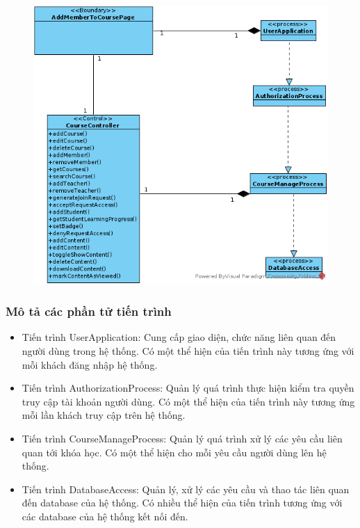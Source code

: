 \documentclass[./../main_file.tex]{subfiles}
\begin{document}
\begin{figure}[H]
	\centering
	\includegraphics[width=\linewidth]{./images/pv_add_course_member.png}
\end{figure}

\subsubsection{Mô tả các phần tử tiến trình}
\begin{itemize}
	\item Tiến trình UserApplication: Cung cấp giao diện, chức năng liên quan đến người dùng trong hệ thống. Có một thể hiện của tiến trình này tương ứng với mỗi khách đăng nhập hệ thống.
	\item Tiến trình AuthorizationProcess: Quản lý quá trình thực hiện kiểm tra quyền truy cập tài khoản người dùng.
	Có một thể hiện của tiến trình này tương ứng mỗi lần khách truy cập trên hệ thống.
\item Tiến trình CourseManageProcess: Quản lý quá trình xử lý các yêu cầu liên quan tới khóa học.
	Có một thể hiện cho mỗi yêu cầu người dùng lên hệ thống.
	\item Tiến trình DatabaseAccess: Quản lý, xử lý các yêu cầu và thao tác liên quan đến database của hệ thống. Có nhiều thể hiện của tiến trình tương ứng với các database của hệ thống kết nối đến.
\end{itemize}
\end{document}
